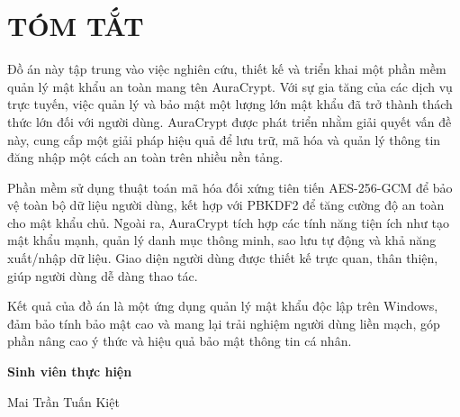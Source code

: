 \chapter*{TÓM TẮT}

Đồ án này tập trung vào việc nghiên cứu, thiết kế và triển khai một phần mềm quản lý mật khẩu an toàn mang tên AuraCrypt. Với sự gia tăng của các dịch vụ trực tuyến, việc quản lý và bảo mật một lượng lớn mật khẩu đã trở thành thách thức lớn đối với người dùng. AuraCrypt được phát triển nhằm giải quyết vấn đề này, cung cấp một giải pháp hiệu quả để lưu trữ, mã hóa và quản lý thông tin đăng nhập một cách an toàn trên nhiều nền tảng.

Phần mềm sử dụng thuật toán mã hóa đối xứng tiên tiến AES-256-GCM để bảo vệ toàn bộ dữ liệu người dùng, kết hợp với PBKDF2 để tăng cường độ an toàn cho mật khẩu chủ. Ngoài ra, AuraCrypt tích hợp các tính năng tiện ích như tạo mật khẩu mạnh, quản lý danh mục thông minh, sao lưu tự động và khả năng xuất/nhập dữ liệu. Giao diện người dùng được thiết kế trực quan, thân thiện, giúp người dùng dễ dàng thao tác.

Kết quả của đồ án là một ứng dụng quản lý mật khẩu độc lập trên Windows, đảm bảo tính bảo mật cao và mang lại trải nghiệm người dùng liền mạch, góp phần nâng cao ý thức và hiệu quả bảo mật thông tin cá nhân.

\vspace{1cm}
\begin{flushright}
\textbf{Sinh viên thực hiện}\par
Mai Trần Tuấn Kiệt\par
\end{flushright}
\newpage